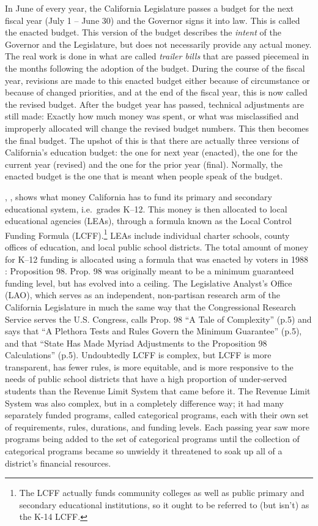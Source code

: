 In June of every year, the California Legislature passes a budget for the next fiscal year (July 1 – June 30) and the Governor signs it into law. This is called the enacted budget. This version of the budget describes the \textit{intent} of the Governor and the Legislature, but does not necessarily provide any actual money. The real work is done in what are called \textit{trailer bills} that are passed piecemeal in the months following the adoption of the budget. During the course of the fiscal year, revisions are made to this enacted budget either because of circumstance or because of changed priorities, and at the end of the fiscal year, this is now called the revised budget. After the budget year has passed, technical adjustments are still made: Exactly how much money was spent, or what was misclassified and improperly allocated will change the revised budget numbers. This then becomes the final budget. The upshot of this is that there are actually three versions of California's education budget: the one for next year (enacted), the one for the current year (revised) and the one for the prior year (final). Normally, the enacted budget is the one that is meant when people speak of the budget.  

, \textit{}, shows what money California has to fund its primary and secondary educational system, i.e.~grades K–12. This money is then allocated to local educational agencies (LEAs), through a formula known as the Local Control Funding Formula (LCFF).\footnote{The LCFF actually funds community colleges as well as public primary and secondary educational institutions, so it ought to be referred to (but isn't) as the K-14 LCFF.} LEAs include individual charter schools, county offices of education, and local public school districts. The total amount of money for K–12 funding is allocated using a formula that was enacted by voters in 1988 \parencite{LAO2017}: Proposition 98. Prop. 98 was originally meant to be a minimum guaranteed funding level, but has evolved into a ceiling. The Legislative Analyst's Office (LAO), which serves as an independent, non-partisan research arm of the California Legislature in much the same way that the Congressional Research Service serves the U.S. Congress, calls Prop. 98 ``A Tale of Complexity''  (p.5) and says that ``A Plethora Tests and Rules Govern the Minimum Guarantee'' (p.5), and that ``State Has Made Myriad Adjustments to the Proposition 98 Calculations'' (p.5). Undoubtedly LCFF is complex, but LCFF is more transparent, has fewer rules, is more equitable, and is more responsive to the needs of public school districts that have a high proportion of under-served students than the Revenue Limit System that came before it. The Revenue Limit System was also complex, but in a completely difference way; it had many separately funded programs, called categorical programs, each with their own set of requirements, rules, durations, and funding levels. Each passing year saw more programs being added to the set of categorical programs until the collection of categorical programs became so unwieldy it threatened to soak up all of a district's financial resources.

